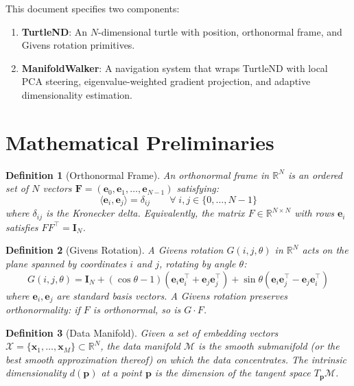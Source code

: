 \documentclass[11pt,letterpaper]{article}
\newtheorem{definition}{Definition}[section]
\newcommand{\R}{\mathbb{R}}
\newcommand{\frame}{\mathbf{F}}
\newcommand{\pos}{\mathbf{p}}
\newcommand{\basis}{\mathbf{e}}
\newcommand{\manifold}{\mathcal{M}}
\newcommand{\tangent}{T}
\newcommand{\eye}{\mathbf{I}}
\begin{document}
This document specifies two components:
\begin{enumerate}[label=(\roman*)]
  \item \textbf{TurtleND}: An $N$-dimensional turtle with position, orthonormal frame, and Givens rotation primitives.
  \item \textbf{ManifoldWalker}: A navigation system that wraps TurtleND with local PCA steering, eigenvalue-weighted gradient projection, and adaptive dimensionality estimation.
\end{enumerate}

\section{Mathematical Preliminaries}
\label{sec:prelim}

\begin{definition}[Orthonormal Frame]
\label{def:frame}
An \emph{orthonormal frame} in $\R^N$ is an ordered set of $N$ vectors
$\frame = (\basis_0, \basis_1, \ldots, \basis_{N-1})$ satisfying:
\begin{equation}
  \langle \basis_i, \basis_j \rangle = \delta_{ij}
  \qquad \forall\; i, j \in \{0, \ldots, N-1\}
\end{equation}
where $\delta_{ij}$ is the Kronecker delta. Equivalently, the matrix
$F \in \R^{N \times N}$ with rows $\basis_i$ satisfies $F F^\top = \eye_N$.
\end{definition}

\begin{definition}[Givens Rotation]
\label{def:givens}
A \emph{Givens rotation} $G(i, j, \theta)$ in $\R^N$ acts on the plane
spanned by coordinates $i$ and $j$, rotating by angle $\theta$:
\begin{equation}
  G(i, j, \theta) = \eye_N + (\cos\theta - 1)(\mathbf{e}_i\mathbf{e}_i^\top + \mathbf{e}_j\mathbf{e}_j^\top) + \sin\theta(\mathbf{e}_i\mathbf{e}_j^\top - \mathbf{e}_j\mathbf{e}_i^\top)
\end{equation}
where $\mathbf{e}_i, \mathbf{e}_j$ are standard basis vectors. A Givens
rotation preserves orthonormality: if $F$ is orthonormal, so is $G \cdot F$.
\end{definition}

\begin{definition}[Data Manifold]
\label{def:manifold}
Given a set of embedding vectors $\mathcal{X} = \{\mathbf{x}_1, \ldots, \mathbf{x}_M\} \subset \R^N$,
the \emph{data manifold} $\manifold$ is the smooth submanifold (or the
best smooth approximation thereof) on which the data concentrates. The
\emph{intrinsic dimensionality} $d(\pos)$ at a point $\pos$ is the
dimension of the tangent space $\tangent_\pos\manifold$.
\end{definition}
\end{document}
